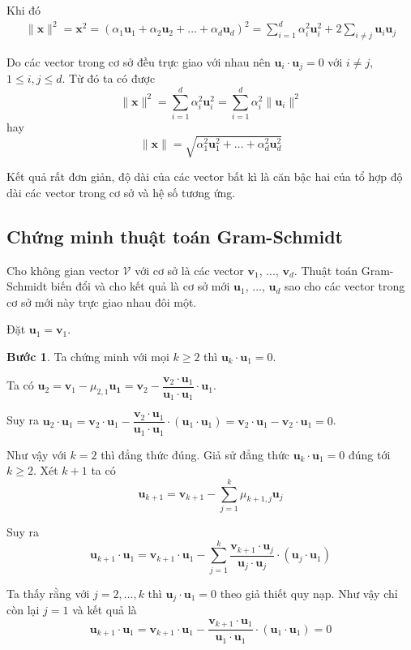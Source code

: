 Khi đó
\begin{align*}
    \lVert \bm{x} \rVert^2 = \bm{x}^2 = (\alpha_1 \bm{u}_1 + \alpha_2 \bm{u}_2 + \ldots + \alpha_d \bm{u}_d)^2 = \sum_{i=1}^d \alpha_i^2 \bm{u}_i^2 + 2 \sum_{i \neq j} \bm{u}_i \bm{u}_j
\end{align*}

Do các vector trong cơ sở đều trực giao với nhau nên $\bm{u}_i \cdot \bm{u}_j = 0$ với $i \neq j$, $1 \leqslant i, j \leqslant d$. Từ đó ta có được \[\lVert \bm{x} \rVert^2 = \sum_{i=1}^d \alpha_i^2 \bm{u}_i^2 = \sum_{i=1}^d \alpha_i^2 \lVert \bm{u}_i \rVert^2\] hay \[\lVert \bm{x} \rVert = \sqrt{\alpha_1^2 \bm{u}_1^2 + \ldots + \alpha_d^2 \bm{u}_d^2}\]

Kết quả rất đơn giản, độ dài của các vector bất kì là căn bậc hai của tổ hợp độ dài các vector trong cơ sở và hệ số tương ứng.

\subsection*{Chứng minh thuật toán Gram-Schmidt}

Cho không gian vector $\mathcal{V}$ với cơ sở là các vector $\bm{v}_1$, ..., $\bm{v}_d$. Thuật toán Gram-Schmidt biến đổi và cho kết quả là cơ sở mới $\bm{u}_1$, ..., $\bm{u}_d$ sao cho các vector trong cơ sở mới này trực giao nhau đôi một.

Đặt $\bm{u}_1 = \bm{v}_1$. 

\textbf{Bước 1}. Ta chứng minh với mọi $k \geqslant 2$ thì $\bm{u}_k \cdot \bm{u}_1 = 0$.

Ta có $\bm{u}_2 = \bm{v}_1 - \mu_{2, 1} \bm{u_1} = \bm{v}_2 - \dfrac{\bm{v}_2 \cdot \bm{u}_1}{\bm{u}_1 \cdot \bm{u}_1} \cdot \bm{u}_1$. 

Suy ra $\bm{u}_2 \cdot \bm{u}_1 = \bm{v}_2 \cdot \bm{u}_1 - \dfrac{\bm{v}_2 \cdot \bm{u}_1}{\bm{u}_1 \cdot \bm{u}_1} \cdot (\bm{u}_1 \cdot \bm{u}_1) = \bm{v}_2 \cdot \bm{u}_1 - \bm{v}_2 \cdot \bm{u}_1 = 0$.

Như vậy với $k = 2$ thì đẳng thức đúng. Giả sử đẳng thức $\bm{u}_k \cdot \bm{u}_1 = 0$ đúng tới $k \geqslant 2$. Xét $k+1$ ta có
\[\bm{u}_{k+1} = \bm{v}_{k+1} - \sum_{j=1}^{k} \mu_{k+1, j} \bm{u}_j\]

Suy ra
\[\bm{u}_{k+1} \cdot \bm{u}_1 = \bm{v}_{k+1} \cdot \bm{u}_1 - \sum_{j=1}^{k} \dfrac{\bm{v}_{k+1} \cdot \bm{u}_j}{\bm{u}_j \cdot \bm{u}_j} \cdot (\bm{u}_j \cdot \bm{u}_1 )\]

Ta thấy rằng với $j = 2, \ldots, k$ thì $\bm{u}_j \cdot \bm{u}_1 = 0$ theo giả thiết quy nạp. Như vậy chỉ còn lại $j = 1$ và kết quả là
\[\bm{u}_{k+1} \cdot \bm{u}_1 = \bm{v}_{k+1} \cdot \bm{u}_1 - \dfrac{\bm{v}_{k+1} \cdot \bm{u}_1}{\bm{u}_1 \cdot \bm{u}_1} \cdot (\bm{u}_1 \cdot \bm{u}_1) = 0\]

